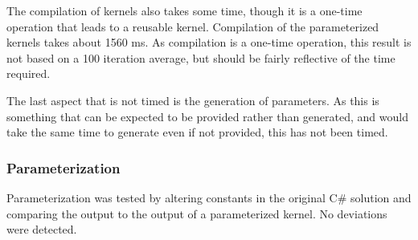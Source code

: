 The compilation of kernels also takes some time, though it is a one-time operation that leads to a reusable kernel.
Compilation of the parameterized kernels takes about 1560 ms.
As compilation is a one-time operation, this result is not based on a 100 iteration average, but should be fairly reflective of the time required.

The last aspect that is not timed is the generation of parameters.
As this is something that can be expected to be provided rather than generated, and would take the same time to generate even if not provided, this has not been timed.

\subsubsection{Parameterization}
Parameterization was tested by altering constants in the original C\# solution and comparing the output to the output of a parameterized kernel. 
No deviations were detected.